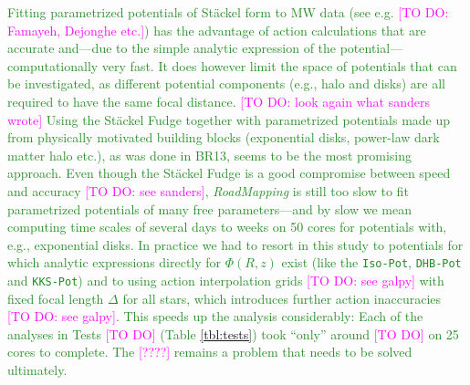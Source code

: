 \documentclass[iop,revtex4]{emulateapj}
\newcommand{\RM}{{\sl RoadMapping}}
\newcommand{\NEW}[1]{\textcolor{ForestGreen}{#1}}
\newcommand{\Wilma}[1]{\textcolor{Magenta}{#1}}
\newcommand{\OLD}[1]{}
\begin{document}
\OLD{BR13 fitted a MW-like model potential and calculated actions using the St\"{a}ckel \OLD{approximation}\NEW{Fudge} \citep{2012MNRAS.426.1324B}; in this case study we directly fitted a St\"{a}ckel potential to the data, with exact actions in the model potential. The latter is computationally much less expensive due to the simple analytic form of the potential. It would also allow flexibility by expressing the MW potential as a superposition of many more simple Kuzmin-Kutuzov St\"{a}ckel components (\citet{2003MNRAS.340..752F} used for example 3 components). The former approach by BR13 however allows to parametrize the potential with intuitive and physically motivated building blocks (exponential disks, power-law dark matter halo etc.). While both approaches are formally similar, it remains to decide which is better.}
\NEW{Fitting parametrized potentials of St\"{a}ckel form to MW data (see e.g. \Wilma{[TO DO: Famayeh, Dejonghe etc.]}) has the advantage of action calculations that are accurate and---due to the simple analytic expression of the potential---computationally very fast. It does however limit the space of potentials that can be investigated, as different potential components (e.g., halo and disks) are all required to have the same focal distance. \Wilma{[TO DO: look again what sanders wrote]} Using the St\"{a}ckel Fudge \citep{2012MNRAS.426.1324B} together with parametrized potentials made up from physically motivated building blocks (exponential disks, power-law dark matter halo etc.), as was done in BR13, seems to be the most promising approach. Even though the St\"{a}ckel Fudge is a good compromise between speed and accuracy \Wilma{[TO DO: see sanders]}, \RM{} is still too slow to fit parametrized potentials of many free parameters---and by slow we mean computing time scales of several days to weeks on 50 cores for potentials with, e.g., exponential disks. In practice we had to resort in this study to potentials for which analytic expressions directly for $\Phi(R,z)$ exist (like the \texttt{Iso-Pot}, \texttt{DHB-Pot} and \texttt{KKS-Pot}) and to using action interpolation grids \Wilma{[TO DO: see galpy]} with fixed focal length $\Delta$ for all stars, which introduces further action inaccuracies \Wilma{[TO DO: see galpy]}. This speeds up the analysis considerably: Each of the analyses in Tests \Wilma{[TO DO]} (Table \ref{tbl:tests}) took ``only'' around \Wilma{[TO DO]} on 25 cores to complete. The \Wilma{[????]} remains a problem that needs to be solved ultimately.}\\
\end{document}
